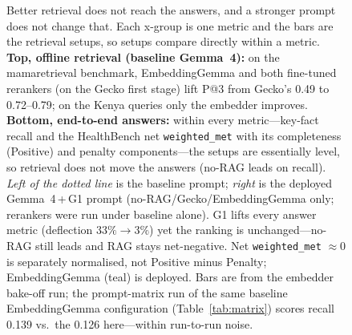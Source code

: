\begin{figure}[t]
\caption{Better retrieval does not reach the answers, and a stronger prompt
does not change that. Each x-group is one metric and the bars are the
retrieval setups, so setups compare directly within a metric.
\textbf{Top, offline retrieval (baseline Gemma~4):} on the mamaretrieval
benchmark, EmbeddingGemma and both fine-tuned rerankers (on the Gecko first
stage) lift P@3 from Gecko's 0.49 to 0.72--0.79; on the Kenya queries only the
embedder improves. \textbf{Bottom, end-to-end answers:} within every
metric---key-fact recall and the HealthBench net \texttt{weighted\_met} with
its completeness (Positive) and penalty components---the setups are
essentially level, so retrieval does not move the answers (no-RAG leads on
recall). \emph{Left of the dotted line} is the baseline prompt; \emph{right}
is the deployed Gemma~4\,+\,G1 prompt (no-RAG/Gecko/EmbeddingGemma only;
rerankers were run under baseline alone). G1 lifts every answer metric
(deflection $33\%\!\to\!3\%$) yet the ranking is unchanged---no-RAG still
leads and RAG stays net-negative. Net \texttt{weighted\_met} $\approx0$ is
separately normalised, not Positive minus Penalty; EmbeddingGemma (teal) is
deployed. Bars are from the embedder bake-off run; the prompt-matrix run of
the same baseline EmbeddingGemma configuration (Table~\ref{tab:matrix})
scores recall 0.139 vs.\ the 0.126 here---within run-to-run noise.}
\label{fig:retr-converts}
\end{figure}

